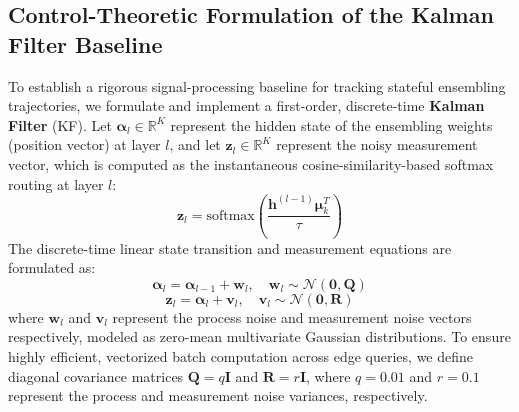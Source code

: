 \subsection{Control-Theoretic Formulation of the Kalman Filter Baseline}
\label{sec:appendix_kalman_formulation}
To establish a rigorous signal-processing baseline for tracking stateful ensembling trajectories, we formulate and implement a first-order, discrete-time \textbf{Kalman Filter} (KF). Let $\boldsymbol{\alpha}_l \in \mathbb{R}^K$ represent the hidden state of the ensembling weights (position vector) at layer $l$, and let $\mathbf{z}_l \in \mathbb{R}^K$ represent the noisy measurement vector, which is computed as the instantaneous cosine-similarity-based softmax routing at layer $l$:
\begin{equation}
    \mathbf{z}_l = \text{softmax} \left( \frac{\mathbf{h}^{(l-1)} \boldsymbol{\mu}_k^T}{\tau} \right)
\end{equation}
The discrete-time linear state transition and measurement equations are formulated as:
\begin{equation}
    \boldsymbol{\alpha}_l = \boldsymbol{\alpha}_{l-1} + \mathbf{w}_l, \quad \mathbf{w}_l \sim \mathcal{N}(\mathbf{0}, \mathbf{Q})
\end{equation}
\begin{equation}
    \mathbf{z}_l = \boldsymbol{\alpha}_l + \mathbf{v}_l, \quad \mathbf{v}_l \sim \mathcal{N}(\mathbf{0}, \mathbf{R})
\end{equation}
where $\mathbf{w}_l$ and $\mathbf{v}_l$ represent the process noise and measurement noise vectors respectively, modeled as zero-mean multivariate Gaussian distributions. To ensure highly efficient, vectorized batch computation across edge queries, we define diagonal covariance matrices $\mathbf{Q} = q \mathbf{I}$ and $\mathbf{R} = r \mathbf{I}$, where $q = 0.01$ and $r = 0.1$ represent the process and measurement noise variances, respectively.


